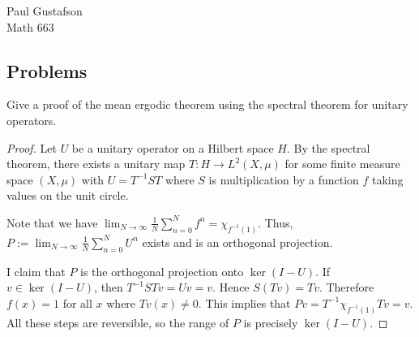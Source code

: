 \documentclass{article}
\begin{document}
\noindent Paul Gustafson\\
\noindent Math 663 


\subsection*{Problems}
 Give a proof of the mean ergodic theorem using the spectral theorem for unitary operators.
\begin{proof}
Let $U$ be a unitary operator on a Hilbert space $H$. By the spectral theorem, there exists a unitary map $T: H \to L^2(X, \mu)$ for some finite measure space $(X, \mu)$ with $U = T^{-1}ST$ where $S$ is multiplication by a function $f$ taking values on the unit circle.

Note that we have $\lim_{N \to \infty} \frac 1 N \sum_{n=0}^N f^n = \chi_{f^{-1}(1)}$. Thus, $P := \lim_{N \to \infty} \frac 1 N \sum_{n=0}^N U^n$ exists and is an orthogonal projection. 

I claim that $P$ is the orthogonal projection onto $\ker(I - U)$. If $v \in \ker(I - U)$, then $T^{-1}STv = Uv = v$. Hence $S(Tv) = Tv$. Therefore $f(x) = 1$ for all $x$ where $Tv(x) \neq 0$. This implies that $Pv = T^{-1} \chi_{f^{-1}(1)} Tv = v$. All these steps are reversible, so the range of $P$ is precisely $\ker(I-U)$.
\end{proof}
\end{document}
